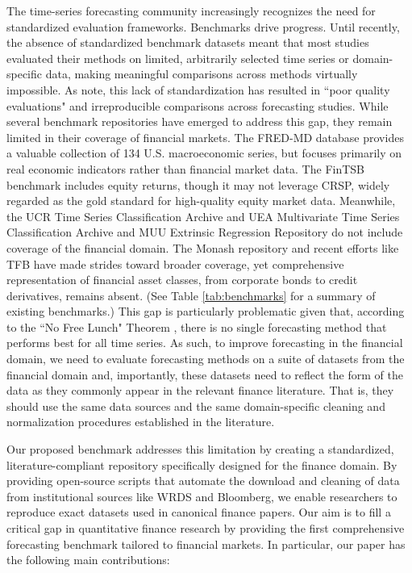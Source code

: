 \documentclass{article}
\begin{document}
The time-series forecasting community increasingly recognizes the need for standardized evaluation frameworks. 
Benchmarks drive progress.
Until recently, the absence of standardized benchmark datasets meant that most studies evaluated their methods on limited, arbitrarily selected time series or domain-specific data, making meaningful comparisons across methods virtually impossible. As \citet{Prater2024} note, this lack of standardization has resulted in ``poor quality evaluations" and irreproducible comparisons across forecasting studies. While several benchmark repositories have emerged to address this gap, they remain limited in their coverage of financial markets. 
The FRED-MD database \citep{McCracken2016} provides a valuable collection of 134 U.S. macroeconomic series, but focuses primarily on real economic indicators rather than financial market data. The FinTSB benchmark \citep{Hu2018} includes equity returns, though it may not leverage CRSP, widely regarded as the gold standard for high-quality equity market data. Meanwhile, the UCR Time Series Classification Archive \citep{Dau2019} and UEA Multivariate Time Series Classification Archive \citep{Bagnall2018} and MUU Extrinsic Regression Repository \citep{Tan2020} do not include coverage of the financial domain.
The Monash repository \citep{Godahewa2021} and recent efforts like TFB \citep{Qiu2024} have made strides toward broader coverage, yet comprehensive representation of financial asset classes, from corporate bonds to credit derivatives, remains absent. (See Table \ref{tab:benchmarks} for a summary of existing benchmarks.) This gap is particularly problematic given that, according to the ``No Free Lunch" Theorem \citep{Wolpert1997},
there is no single forecasting method that performs best for all time series. As such, to improve forecasting in the financial domain, we need to evaluate forecasting methods on a suite of datasets from the financial domain and, importantly,
these datasets need to reflect the form of the data as they commonly appear in the relevant finance literature. That is, they should use the same data sources and the same domain-specific cleaning and normalization procedures established in the literature. 


Our proposed benchmark addresses this limitation by creating a standardized, literature-compliant repository specifically designed for the finance domain. By providing open-source scripts that automate the download and cleaning of data from institutional sources like WRDS and Bloomberg, we enable researchers to reproduce exact datasets used in canonical finance papers. Our aim is to fill a critical gap in quantitative finance research by providing the first comprehensive forecasting benchmark tailored to financial markets. In particular, our paper has the following main contributions:
\end{document}
